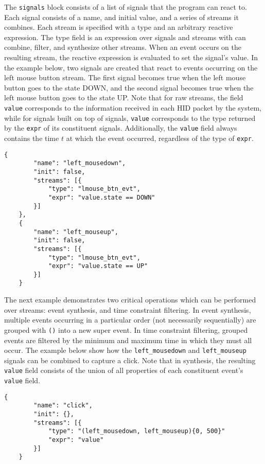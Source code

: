 \documentclass{article}
\begin{document}
The \texttt{signals} block consists of a list of signals that the program can react to. Each signal consists of a name, and initial value, and a series of streams it combines. Each stream is specified with a type and an arbitrary reactive expression. The type field is an expression over signals and streams with can combine, filter, and synthesize other streams. When an event occurs on the resulting stream, the reactive expression is evaluated to set the signal's value. In the example below, two signals are created that react to events occurring on the left mouse button stream. The first signal becomes true when the left mouse button goes to the state DOWN, and the second signal becomes true when the left mouse button goes to the state UP. Note that for raw streams, the field \texttt{value} corresponds to the information received in each HID packet by the system, while for signals built on top of signals, \texttt{value} corresponds to the type returned by the \texttt{expr} of its constituent signals. Additionally, the \texttt{value} field always contains the time $t$ at which the event occurred, regardless of the type of \texttt{expr}.

\begin{Verbatim}[baselinestretch=1.0]
    {
        "name": "left_mousedown",
        "init": false,
        "streams": [{
            "type": "lmouse_btn_evt",
            "expr": "value.state == DOWN"
        }]
    },
    {
        "name": "left_mouseup",
        "init": false,
        "streams": [{
            "type": "lmouse_btn_evt",
            "expr": "value.state == UP"
        }]
    }
\end{Verbatim}

The next example demonstrates two critical operations which can be performed over streams: event synthesis, and time constraint filtering. In event synthesis, multiple events occurring in a particular order (not necessarily sequentially) are grouped with \texttt{()} into a new super event. In time constraint filtering, grouped events are filtered by the minimum and maximum time in which they must all occur. The example below show how the \texttt{left\_mousedown} and \texttt{left\_mouseup} signals can be combined to capture a click. Note that in synthesis, the resulting \texttt{value} field consists of the union of all properties of each constituent event's \texttt{value} field.

\begin{Verbatim}[baselinestretch=1.0]
    {
        "name": "click",
        "init": {},
        "streams": [{
            "type": "(left_mousedown, left_mouseup){0, 500}"
            "expr": "value"
        }]
    }
\end{Verbatim}
\end{document}
